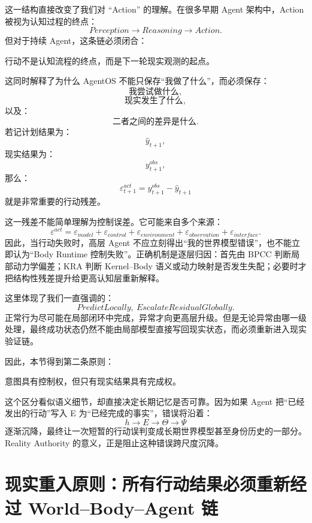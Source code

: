这一结构直接改变了我们对 ``Action'' 的理解。在很多早期 Agent 架构中，Action 被视为认知过程的终点：
\[
Perception\rightarrow Reasoning\rightarrow Action.
\]
但对于持续 Agent，这条链必须闭合：
\begin{statementbox}
\centering
{}
\end{statementbox}
行动不是认知流程的终点，而是下一轮现实观测的起点。

这同时解释了为什么 AgentOS 不能只保存``我做了什么''，而必须保存：
\[
\text{我尝试做什么},
\]
\[
\text{现实发生了什么},
\]
以及：
\[
\text{二者之间的差异是什么}.
\]
若记计划结果为：
\[
\hat{y}_{t+1},
\]
现实结果为：
\[
y^{obs}_{t+1},
\]
那么：
\[
\varepsilon^{act}_{t+1}
=
y^{obs}_{t+1}
-
\hat{y}_{t+1}
\]
就是非常重要的行动残差。

这一残差不能简单理解为控制误差。它可能来自多个来源：
\[
\varepsilon^{act}
=
\varepsilon_{model}
+
\varepsilon_{control}
+
\varepsilon_{environment}
+
\varepsilon_{observation}
+
\varepsilon_{interface}.
\]
因此，当行动失败时，高层 Agent 不应立刻得出``我的世界模型错误''，也不能立即认为``Body Runtime 控制失败''。正确机制是逐层归因：首先由 BPCC 判断局部动力学偏差；KRA 判断 Kernel--Body 语义或动力映射是否发生失配；必要时才把结构性残差提升给更高认知层重新解释。

这里体现了我们一直强调的：
\[
\boxed{
PredictLocally,\ EscalateResidualGlobally.
}
\]
正常行为尽可能在局部闭环中完成，异常才向更高层升级。但是无论异常由哪一级处理，最终成功状态仍然不能由局部模型直接写回现实状态，而必须重新进入现实验证链。

因此，本节得到第二条原则：

\begin{proposition*}
意图具有控制权，但只有现实结果具有完成权。
\end{proposition*}

这个区分看似语义细节，却直接决定长期记忆是否可靠。因为如果 Agent 把``已经发出的行动''写入 E 为``已经完成的事实''，错误将沿着：
\[
h\rightarrow E\rightarrow\Theta\rightarrow\Psi
\]
逐渐沉降，最终让一次短暂的行动误判变成长期世界模型甚至身份历史的一部分。Reality Authority 的意义，正是阻止这种错误跨尺度沉降。

\section{现实重入原则：所有行动结果必须重新经过 World--Body--Agent 链}

